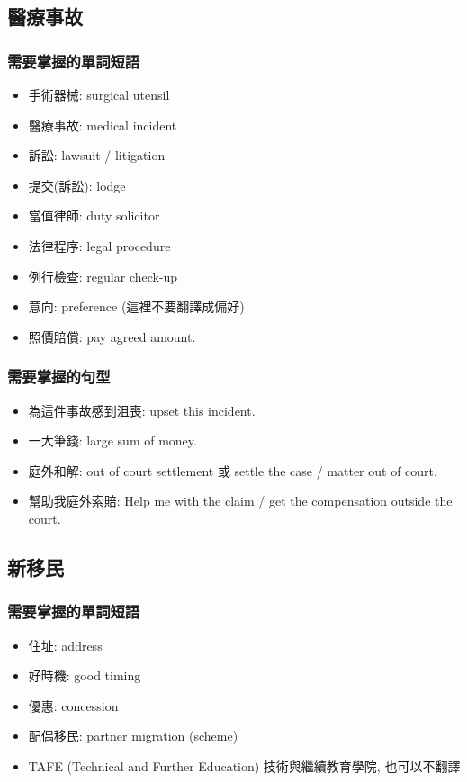 \subsection{醫療事故}
\subsubsection*{需要掌握的單詞短語}
\begin{multicols}{2}
\begin{itemize}
  \itemsep0em
  \item 手術器械: surgical utensil
  \item 醫療事故: medical incident
  \item 訴訟: lawsuit / litigation
  \item 提交(訴訟): lodge
  \item 當值律師: duty solicitor
  \item 法律程序: legal procedure
  \item 例行檢查: regular check-up
  \item 意向: preference (這裡不要翻譯成偏好)
  \item 照價賠償: pay agreed amount.
\end{itemize}
\end{multicols}

\subsubsection*{需要掌握的句型}
\begin{itemize}
  \itemsep0em
  \item 為這件事故感到沮喪: upset  this incident.
  \item 一大筆錢: large sum of money.
  \item 庭外和解: out of court settlement 或 settle the case / matter out of court.
  \item 幫助我庭外索賠: Help me with the claim / get the compensation outside the court.
\end{itemize}

\subsection{新移民}
\subsubsection*{需要掌握的單詞短語}
\begin{itemize}
  \itemsep0em
  \item 住址:  address
  \item 好時機: good timing
  \item 優惠: concession
  \item 配偶移民: partner migration (scheme)
  \item TAFE (Technical and Further Education) 技術與繼續教育學院, 也可以不翻譯
\end{itemize}

